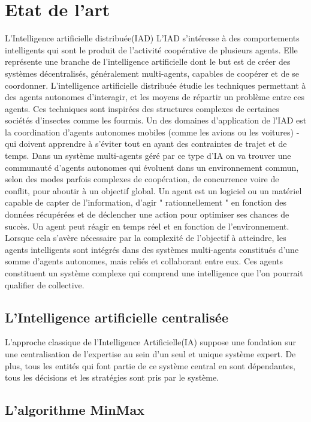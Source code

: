 \documentclass[11pt]{article} %
\begin{document}
\section{Etat de l'art}
L’Intelligence artificielle distribuée(IAD)
L’IAD s’intéresse à des comportements intelligents qui sont le produit de l’activité coopérative de plusieurs agents. Elle représente une branche de l'intelligence artificielle dont le but est de créer des systèmes décentralisés, généralement multi-agents, capables de coopérer et de se coordonner. L'intelligence artificielle distribuée étudie les techniques permettant à des agents autonomes d'interagir, et les moyens de répartir un problème entre ces agents. Ces techniques sont inspirées des structures complexes de certaines sociétés d'insectes comme les fourmis. Un des domaines d'application de l'IAD est la coordination d'agents autonomes mobiles (comme les avions ou les voitures) - qui doivent apprendre à s'éviter tout en ayant des contraintes de trajet et de temps. 
Dans un système multi-agents géré par ce type d’IA on va trouver une communauté d’agents autonomes qui évoluent dans un environnement commun, selon des modes parfois complexes de coopération, de concurrence voire de conflit, pour aboutir à un objectif global. Un agent est un logiciel ou un matériel capable de capter de l’information, d’agir " rationnellement " en fonction des données récupérées et de déclencher une action pour optimiser ses chances de succès.
Un agent peut réagir en temps réel et en fonction de l’environnement. Lorsque cela s’avère nécessaire par la complexité de l’objectif à atteindre, les agents intelligents sont intégrés dans des systèmes multi-agents constitués d’une somme d’agents autonomes, mais reliés et collaborant entre eux. 
Ces agents constituent un système complexe qui comprend une intelligence que l’on pourrait qualifier de collective.

\subsection{L’Intelligence artificielle centralisée}

L’approche classique de l’Intelligence Artificielle(IA) suppose une fondation sur une centralisation de l’expertise au sein d’un seul et unique système expert. De plus, tous les entités qui font partie de ce système central en sont dépendantes, tous les décisions et les stratégies sont pris par le système.

\subsection{L’algorithme MinMax}
\end{document}
